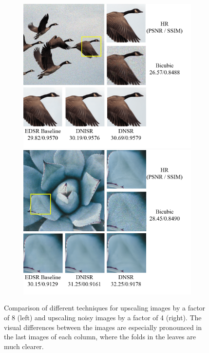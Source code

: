 \documentclass[10pt,twocolumn,letterpaper]{article}
\begin{document}
\begin{figure}[ht!]
\begin{subfigure}[t]{0.4\textwidth}
    \includegraphics[width=\textwidth]{Images/Samples/2-2.png}\\
    \includegraphics[width=\textwidth]{Images/Samples/2-3.png}
\end{subfigure}
\caption{Comparison of different techniques for upscaling images by a factor of 8 (left) and upscaling noisy images by a factor of 4 (right). The visual differences between the images are especially pronounced in the last images of each column, where the folds in the leaves are much clearer.}
\label{fig:samples}
\end{figure}

{\small


}
\end{document}
